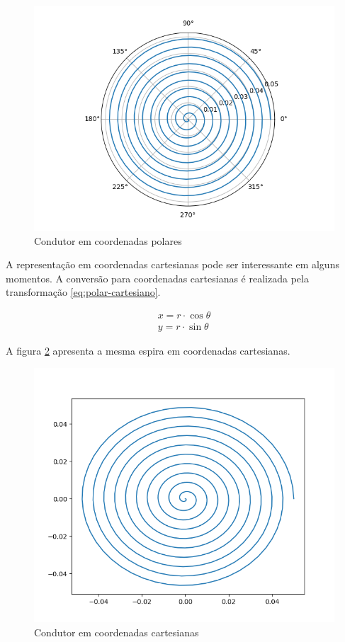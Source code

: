 \documentclass[
	article,			%
	11pt,				%
	oneside,			%
	a4paper,			%
	english,			%
	brazil,				%
	sumario=tradicional
	]{abntex2}
\begin{document}
\begin{figure}[h]
	\centering
	\includegraphics[width=0.7\linewidth]{figures/espirapolar}
	\caption[Condutor em coordenadas polares]{Condutor em coordenadas polares}
	\label{fig:condutor-polar}
\end{figure}

A representação em coordenadas cartesianas pode ser interessante em alguns momentos. A conversão para coordenadas cartesianas é realizada pela transformação \ref{eq:polar-cartesiano}.

\begin{equation} \label{eq:polar-cartesiano}
	\begin{array}{l}
	x = r \cdot \cos \theta\\ 
	y = r \cdot \sin \theta
	\end{array}
\end{equation}

A figura \ref{fig:espiracartesiana} apresenta a mesma espira em coordenadas cartesianas.

\begin{figure}[h]
	\centering
	\includegraphics[width=0.7\linewidth]{figures/espiracartesiana}
	\caption[Condutor em coordenadas cartesianas]{Condutor em coordenadas cartesianas}
	\label{fig:espiracartesiana}
\end{figure}
\end{document}
